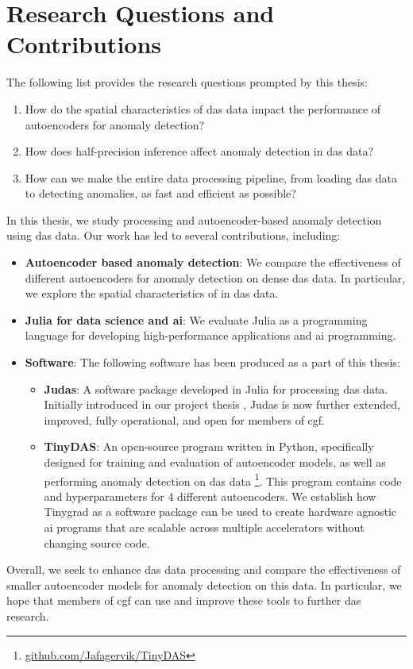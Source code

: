 \section{Research Questions and Contributions}
\label{intro:contribs}

The following list provides the research questions prompted by this thesis: 

\begin{enumerate}
    \item How do the spatial characteristics of \acrshort{das} data impact the performance of autoencoders for anomaly detection?
    \item How does half-precision inference affect anomaly detection in \acrshort{das} data?
    \item How can we make the entire data processing pipeline, from loading \acrshort{das} data to detecting anomalies, as fast and efficient as possible?
\end{enumerate}

In this thesis, we study processing and autoencoder-based anomaly detection using \acrshort{das} data. Our work has led to several contributions, including:

\begin{itemize}
    \item \textbf{Autoencoder based anomaly detection}: We compare the effectiveness of different autoencoders for anomaly detection on dense \acrshort{das} data. In particular, we explore the spatial characteristics of in \acrshort{das} data.
    \item \textbf{Julia for data science and \acrshort{ai}}: We evaluate Julia as a programming language for developing high-performance applications and \acrshort{ai} programming.
    \item \textbf{Software}: The following software has been produced as a part of this thesis:
    \begin{itemize}
        \item \textbf{Judas}: A software package developed in Julia for processing \acrshort{das} data. Initially introduced in our project thesis \cite{projthesis}, Judas is now further extended, improved, fully operational, and open for members of \acrshort{cgf}. 
        \item \textbf{TinyDAS}: An open-source program written in Python, specifically designed for training and evaluation of autoencoder models, as well as performing anomaly detection on \acrshort{das} data \footnote{\url{github.com/Jafagervik/TinyDAS}}. This program contains code and hyperparameters for 4 different autoencoders.  We establish how Tinygrad \cite{tinygrad} as a software package can be used to create hardware agnostic \acrshort{ai} programs that are scalable across multiple accelerators without changing source code. 
    \end{itemize}
\end{itemize}

Overall, we seek to enhance \acrshort{das} data processing and compare the effectiveness of smaller autoencoder models for anomaly detection on this data. In particular, we hope that members of \acrshort{cgf} can use and improve these tools to further \acrshort{das} research.